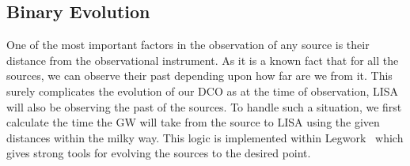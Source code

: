 \subsection{Binary Evolution}\label{subsec:be}
One of the most important factors in the observation of any source is their distance from the observational instrument.
As it is a known fact that for all the sources, we can observe their past depending upon how far are we from it.
This surely complicates the evolution of our DCO as at the time of observation, LISA will also be observing the past of the sources.
To handle such a situation, we first calculate the time the GW will take from the source to LISA using the given distances within the milky way.
This logic is implemented within Legwork~\cite{wagg2021legwork} which gives strong tools for evolving the sources to the desired point.